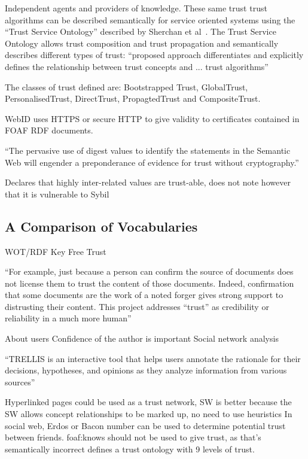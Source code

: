 \documentclass{acm_proc_article-sp}
\begin{document}
Independent agents and providers of knowledge. These same trust trust algorithms can be described semantically for service oriented systems using the ``Trust Service Ontology'' described by Sherchan et al~\cite{sherchan_trust_2010}. The Trust Service Ontology allows trust composition and trust propagation and semantically describes different types of trust: ``proposed approach differentiates and explicitly
defines the relationship between trust concepts and ... trust algorithms''

The classes of trust defined are: Bootstrapped Trust, GlobalTrust, PersonalisedTrust, DirectTrust, PropagtedTrust and CompositeTrust.

WebID uses HTTPS or secure HTTP to give validity to certificates contained in FOAF RDF documents.

``The pervasive use of  digest values to identify the statements in the Semantic Web will  engender a preponderance of evidence for trust without cryptography.''

Declares that highly inter-related values are trust-able, does not note however  that it is vulnerable to Sybil\cite{douceur_sybil_2002}
\cite{reagle_key_2002}

\subsection{A Comparison of Vocabularies}
WOT/RDF
Key Free Trust

``For example, just because a person can confirm the source of documents does not license them to trust the content of those documents. Indeed, confirmation that some documents are the work of a noted forger gives strong support to distrusting their content. This project addresses ``trust'' as credibility or reliability in a much more human''

About users
Confidence of the author is important
Social network analysis

``TRELLIS is an interactive tool that helps users annotate the
rationale for their decisions, hypotheses, and opinions as they analyze information from various sources''\cite{gil_trusting_2002}

Hyperlinked pages could be used as a trust network, SW is better because the SW allows concept relationships to be marked up, no need to use heuristics
In social web, Erdos or Bacon number can be used to determine potential trust between friends.
foaf:knows should not be used to give trust, as that's semantically incorrect
defines a trust ontology with 9 levels of trust.
\end{document}
